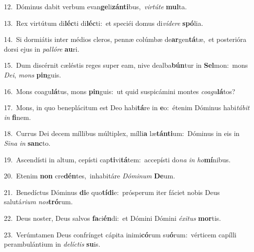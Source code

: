 {\numbfont\textcolor{\numbcolor}{12.}}~Dóminus dabit verbum evan\-\textbf{ge}\-li\-\textbf{zán}\-\textbf{ti}bus,~\star \textit{vir}\-\textit{tú}\textit{te} \textbf{mul}\-ta.\par
{\numbfont\textcolor{\numbcolor}{13.}}~Rex virtútum di\-\textbf{léc}\-ti di\-\textbf{léc}\-ti:~\star et speciéi domus di\-\textit{ví}\-\textit{de}\textit{re} \textbf{spó}\-lia.\par
{\numbfont\textcolor{\numbcolor}{14.}}~Si dormiátis inter médios cleros, pennæ colúmbæ de\-\textbf{ar}\-gen\-\textbf{tá}\-tæ,~\star et posterióra dorsi ejus in \textit{pal}\-\textit{ló}\textit{re} \textbf{au}\-ri.\par
{\numbfont\textcolor{\numbcolor}{15.}}~Dum discérnit cæléstis reges super eam, nive dealba\-\textbf{bún}\-tur in \textbf{Sel}\-mon:~\star mons \textit{De}\-\textit{i}, \textit{mons} \textbf{pin}\-guis.\par
{\numbfont\textcolor{\numbcolor}{16.}}~Mons coagu\-\textbf{lá}\-tus, mons \textbf{pin}\-guis:~\star ut quid suspicámini montes \textit{co}\-\textit{a}\textit{gu}\textbf{lá}tos?\par
{\numbfont\textcolor{\numbcolor}{17.}}~Mons, in quo beneplácitum est Deo habi\-\textbf{tá}\-re in \textbf{e}\-o:~\star étenim Dóminus habi\-\textit{tá}\-\textit{bit} \textit{in} \textbf{fi}\-nem.\par
{\numbfont\textcolor{\numbcolor}{18.}}~Currus Dei decem míllibus múltiplex, mílli\textbf{a} læ\-\textbf{tán}\-\textbf{ti}um:~\star Dóminus in eis in \textit{Si}\-\textit{na} \textit{in} \textbf{sanc}\-to.\par
{\numbfont\textcolor{\numbcolor}{19.}}~Ascendísti in altum, cepísti cap\-\textbf{ti}\-vi\-\textbf{tá}\-tem:~\star accepísti do\textit{na} \textit{in} \textit{ho}\-\textbf{mí}nibus.\par
{\numbfont\textcolor{\numbcolor}{20.}}~Etenim \textbf{non} cre\-\textbf{dén}\-tes,~\star inhabitáre \textit{Dó}\-\textit{mi}\textit{num} \textbf{De}\-um.\par
{\numbfont\textcolor{\numbcolor}{21.}}~Benedíctus Dóminus \textbf{di}\-e quo\-\textbf{tí}\-\textbf{di}e:~\star prósperum iter fáciet nobis Deus salutá\-\textit{ri}\-\textit{um} \textit{nos}\-\textbf{tró}rum.\par
{\numbfont\textcolor{\numbcolor}{22.}}~Deus noster, Deus salvos \textbf{fa}\-ci\-\textbf{én}\-di:~\star et Dómini Dómini \textit{éx}\-\textit{i}\textit{tus} \textbf{mor}\-tis.\par
{\numbfont\textcolor{\numbcolor}{23.}}~Verúmtamen Deus confrínget cápita inimi\-\textbf{có}\-rum su\-\textbf{ó}\-rum:~\star vérticem capílli perambulántium in \textit{de}\-\textit{líc}\textit{tis} \textbf{su}\-is.\par
